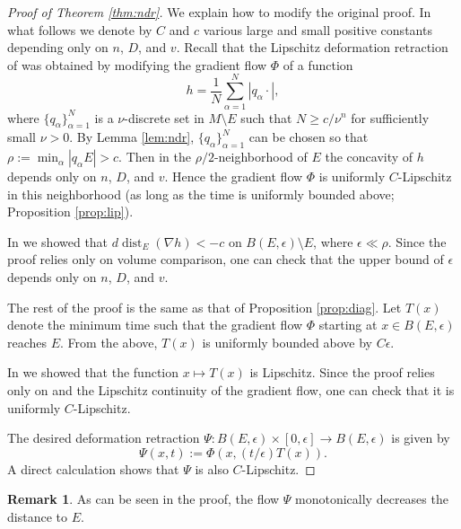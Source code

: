 \documentclass[a4paper,12pt]{amsart}
\theoremstyle{plain}
\theoremstyle{definition}
\newtheorem{rem}[thm]{Remark}
\numberwithin{thm}{section}
\numberwithin{equation}{section}
\DeclareMathOperator{\dist}{dist}
\begin{document}
\begin{proof}[Proof of Theorem \ref{thm:ndr}]
We explain how to modify the original proof.
In what follows we denote by $C$ and $c$ various large and small positive constants depending only on $n$, $D$, and $v$.
Recall that the Lipschitz deformation retraction of \cite[1.5]{F:reg} was obtained by modifying the gradient flow $\Phi$ of a function
\[h=\frac1N\sum_{\alpha=1}^N|q_\alpha\cdot|,\]
where $\{q_\alpha\}_{\alpha=1}^N$ is a $\nu$-discrete set in $M\setminus E$ such that $N\ge c/\nu^n$ for sufficiently small $\nu>0$.
By Lemma \ref{lem:ndr}, $\{q_\alpha\}_{\alpha=1}^N$ can be chosen so that $\rho:=\min_\alpha|q_\alpha E|>c$.
Then in the $\rho/2$-neighborhood of $E$ the concavity of $h$ depends only on $n$, $D$, and $v$.
Hence the gradient flow $\Phi$ is uniformly $C$-Lipschitz in this neighborhood (as long as the time is uniformly bounded above; Proposition \ref{prop:lip}).

In \cite[A.1]{F:reg} we showed that $d\dist_E(\nabla h)<-c$ on $B(E,\epsilon)\setminus E$, where $\epsilon\ll\rho$.
Since the proof relies only on volume comparison, one can check that the upper bound of $\epsilon$ depends only on $n$, $D$, and $v$.

The rest of the proof is the same as that of Proposition \ref{prop:diag}.
Let $T(x)$ denote the minimum time such that the gradient flow $\Phi$ starting at $x\in B(E,\epsilon)$ reaches $E$.
From the above, $T(x)$ is uniformly bounded above by $C\epsilon$.

In \cite[A.2]{F:reg} we showed that the function $x\mapsto T(x)$ is Lipschitz.
Since the proof relies only on \cite[A.1]{F:reg} and the Lipschitz continuity of the gradient flow, one can check that it is uniformly $C$-Lipschitz.

The desired deformation retraction $\Psi:B(E,\epsilon)\times[0,\epsilon]\to B(E,\epsilon)$ is given by
\[\Psi(x,t):=\Phi\left(x,(t/\epsilon)T(x)\right).\]
A direct calculation shows that $\Psi$ is also $C$-Lipschitz.
\end{proof}

\begin{rem}\label{rem:ndr}
As can be seen in the proof, the flow $\Psi$ monotonically decreases the distance to $E$.
\end{rem}
\end{document}
